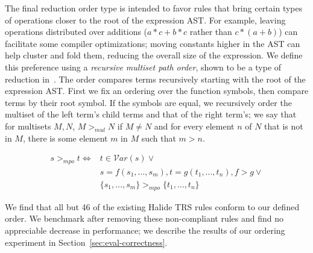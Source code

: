 \documentclass[sigplan,10pt,review,anonymous]{acmart}\settopmatter{printfolios=true,printccs=false,printacmref=false}
\newcommand{\NumOrderingProblems}{{\color{red} 46}\xspace}
\begin{document}
The final reduction order type is intended to favor rules that bring certain
types of operations closer to the root of the expression AST. For example,
leaving operations distributed over additions ($a*c + b*c$ rather than
$c*(a +b)$) can facilitate some compiler optimizations; moving constants higher in the
AST can help cluster and fold them, reducing the overall size of the expression.
We define this preference using a \emph{recursive multiset path order}, shown to be a type of reduction in~\cite{baader1999term}. The order compares terms recursively starting with the root of the expression AST. First we
fix an ordering over the function symbols, then compare terms by their root
symbol. If the symbols are equal, we recursively order the multiset of the left
term's child terms and that of the right term's; we say that for multisets $M,
N$, $M >_{mul} N$ if $M \neq N$ and for every element $n$ of $N$ that is not in
$M$, there is some element $m$ in $M$ such that $m > n$.

\begin{equation*}
\begin{split}
s >_{mpo} t \iff & t \in \mathcal{V}ar(s) \vee \\
              &  s = f(s_1,\dots,s_m), t = g(t_1,...,t_n), f > g \vee \\
               & \{s_1, \dots, s_m\} >_{mpo} \{t_1,\dots,t_n\}
\end{split}
\end{equation*}

We find that all but \NumOrderingProblems of the existing Halide TRS rules conform to our defined order. We benchmark after removing these non-compliant rules and find no appreciable decrease in performance; we describe the results of our ordering experiment in Section~\ref{sec:eval-correctness}.
\end{document}
